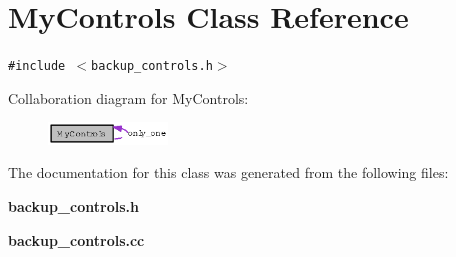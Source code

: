 \section{My\-Controls Class Reference}
\label{classMyControls}
{\tt \#include $<$backup\_\-controls.h$>$}

Collaboration diagram for My\-Controls:\begin{figure}[H]
\begin{center}
\leavevmode
\includegraphics[width=90pt]{classMyControls__coll__graph}
\end{center}
\end{figure}


The documentation for this class was generated from the following files:\begin{CompactItemize}
\item 
{\bf backup\_\-controls.h}\item 
{\bf backup\_\-controls.cc}\end{CompactItemize}
